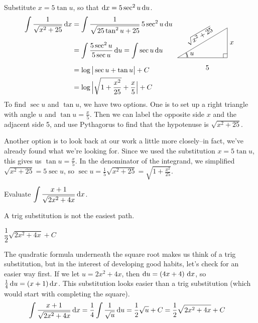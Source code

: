 \begin{solution}
Substitute $x=5\tan u$, so that $\mathrm{d}x=5 \sec^2u\,\mathrm{d}u$.
\begin{align*}
\int\frac{1}{\sqrt{x^2+25}}\,\dee{x}
&=\int \frac{1}{\sqrt{25\tan^2 u+25}}\,5\sec^2 u\,\dee{u}   \\[0.1in]
&=\int \frac{5\sec^2u}{5\sec u}\,\dee{u}
=\int \sec u\,\dee{u} \\[0.1in]
&= \log\big|\sec u+\tan u\big|+C
\qquad\qquad\smash{
\trigtri{u}{5}{x}{\sqrt{x^2+25}}} \\
&= \log\Big|\sqrt{1+\frac{x^2}{25}}+\frac{x}{5}\Big|+C
\end{align*}
To find $\sec u$ and $\tan u$, we have two options. One is to set up a right triangle with angle $u$ and $\tan u = \frac{x}{5}$. Then we can label the opposite side $x$ and the adjacent side 5, and use Pythagorus to find that the hypotenuse is $\sqrt{x^2+25}$.

Another option is to look back at our work a little more closely--in fact, we've already found what we're looking for. Since we used the substitution $x=5\tan u$, this gives us $\tan u = \frac{x}{5}$. In the denominator of the integrand, we simplified $\sqrt{x^2+25} = 5\sec u$, so $\sec u = \frac{1}{5}\sqrt{x^2+25} = \sqrt{1+\frac{x^2}{25}}$.
\end{solution}
\begin{question}
Evaluate $\displaystyle\int\frac{x+1}{\sqrt{2x^2+4x}}
\, \mathrm{d}x$.
\end{question}
\begin{hint}
A trig substitution is not the easiest path.
\end{hint}
\begin{answer}
$\dfrac{1}{2}\sqrt{2x^2+4x}+C$
\end{answer}
\begin{solution}
The quadratic formula underneath the square root makes us think of a trig substitution, but in the interest of developing good habits, let's check for an easier way first. If we let $u=2x^2+4x$, then $\mathrm{d}u = (4x+4)~\mathrm{d}x$, so $\frac{1}{4}\,\mathrm{d}u=(x+1)\,\mathrm{d}x$. This substitution looks easier than a trig substitution (which would start with completing the square).
\begin{align*}
\int\frac{x+1}{\sqrt{2x^2+4x}}
\, \mathrm{d}x&=\frac{1}{4}\int \frac{1}{\sqrt{u}}\,\mathrm{d}u = \frac{1}{2}\sqrt{u}+C = \frac{1}{2}\sqrt{2x^2+4x}+C
\end{align*}

\end{solution}



